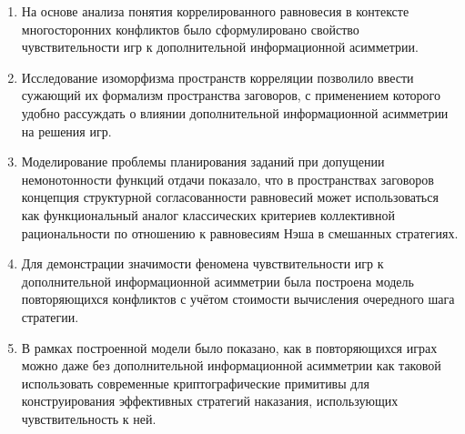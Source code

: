 \begin{enumerate}
  \item На основе анализа понятия коррелированного равновесия в контексте многосторонних конфликтов было сформулировано свойство чувствительности игр к дополнительной информационной асимметрии.
  \item Исследование изоморфизма пространств корреляции позволило ввести сужающий их формализм пространства заговоров, с применением которого удобно рассуждать о влиянии дополнительной информационной асимметрии на решения игр.
  \item Моделирование проблемы планирования заданий при допущении немонотонности функций отдачи показало, что в пространствах заговоров концепция структурной согласованности равновесий может использоваться как функциональный аналог классических критериев коллективной рациональности по отношению к равновесиям Нэша в смешанных стратегиях. 
  \item Для демонстрации значимости феномена чувствительности игр к дополнительной информационной асимметрии была построена модель повторяющихся конфликтов с учётом стоимости вычисления очередного шага стратегии.
  \item В рамках построенной модели было показано, как в повторяющихся играх можно даже без дополнительной информационной асимметрии как таковой использовать современные криптографические примитивы для конструирования эффективных стратегий наказания, использующих чувствительность к ней.
\end{enumerate}
